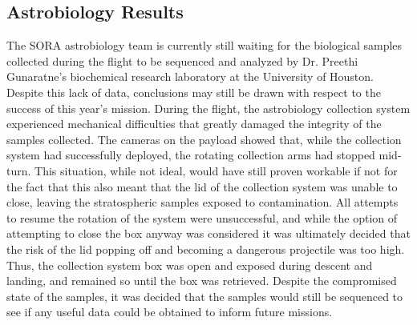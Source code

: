 \subsection{Astrobiology Results}
\label{sec:Astrobiology-Results}

The SORA astrobiology team is currently still waiting for the biological samples collected during the flight to be sequenced and analyzed by Dr. Preethi Gunaratne’s biochemical research laboratory at the University of Houston. Despite this lack of data, conclusions may still be drawn with respect to the success of this year’s mission. During the flight, the astrobiology collection system experienced mechanical difficulties that greatly damaged the integrity of the samples collected. The cameras on the payload showed that, while the collection system had successfully deployed, the rotating collection arms had stopped mid-turn. This situation, while not ideal, would have still proven workable if not for the fact that this also meant that the lid of the collection system was unable to close, leaving the stratospheric samples exposed to contamination. All attempts to resume the rotation of the system were unsuccessful, and while the option of attempting to close the box anyway was considered it was ultimately decided that the risk of the lid popping off and becoming a dangerous projectile was too high. Thus, the collection system box was open and exposed during descent and landing, and remained so until the box was retrieved. Despite the compromised state of the samples, it was decided that the samples would still be sequenced to see if any useful data could be obtained to inform future missions.				

